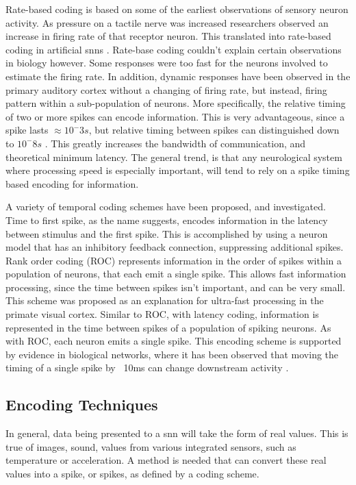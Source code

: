     Rate-based coding is based on some of the earliest observations of sensory
    neuron activity. As pressure on a tactile nerve was increased researchers
    observed an increase in firing rate of that receptor neuron. This translated
    into rate-based coding in artificial \Glspl{snn} \cite{ponulak_2011}. Rate-base
    coding couldn't explain certain observations in biology however. Some
    responses were too fast for the neurons involved to estimate the firing
    rate. In addition, dynamic responses have been observed in the primary
    auditory cortex without a changing of firing rate, but instead, firing
    pattern within a sub-population of neurons. More specifically, the relative
    timing of two or more spikes can encode information. This is very
    advantageous, since a spike lasts $\approx 10^-3s$, but relative timing
    between spikes can distinguished down to $10^-8s$ \cite{ponulak_2011}. This
    greatly increases the bandwidth of communication, and theoretical minimum
    latency. The general trend, is that any neurological system where processing
    speed is especially important, will tend to rely on a spike timing based
    encoding for information.
    
    A variety of temporal coding schemes have been proposed, and
    investigated. Time to first spike, as the name suggests, encodes information
    in the latency between stimulus and the first spike. This is accomplished by
    using a neuron model that has an inhibitory feedback connection, suppressing
    additional spikes. Rank order coding (ROC) represents information in the
    order of spikes within a population of neurons, that each emit a single
    spike. This allows fast information processing, since the time between
    spikes isn't important, and can be very small. This scheme was proposed as
    an explanation for ultra-fast processing in the primate visual
    cortex. Similar to ROC, with latency coding, information is represented in
    the time between spikes of a population of spiking neurons. As with ROC,
    each neuron emits a single spike. This encoding scheme is supported by
    evidence in biological networks, where it has been observed that moving the
    timing of a  single spike by ~10ms can change downstream activity
    \cite{ponulak_2011}.
        
    \subsection{Encoding Techniques}
    In general, data being presented to a \Gls{snn} will take the form of real
    values. This is true of images, sound, values from various integrated
    sensors, such as temperature or acceleration. A method is needed that can
    convert these real values into a spike, or spikes, as defined by a coding
    scheme.
    
